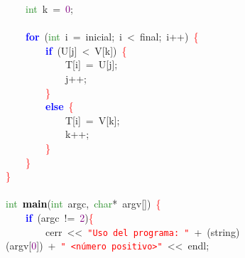 \mbox{}\ \ \ \ \textcolor{ForestGreen}{int}\ k\ \textcolor{BrickRed}{=}\ \textcolor{Purple}{0}\textcolor{BrickRed}{;} \\
\mbox{} \\
\mbox{}\ \ \ \ \textbf{\textcolor{Blue}{for}}\ \textcolor{BrickRed}{(}\textcolor{ForestGreen}{int}\ i\ \textcolor{BrickRed}{=}\ inicial\textcolor{BrickRed}{;}\ i\ \textcolor{BrickRed}{\textless{}}\ final\textcolor{BrickRed}{;}\ i\textcolor{BrickRed}{++)}\ \textcolor{Red}{\{} \\
\mbox{}\ \ \ \ \ \ \ \ \textbf{\textcolor{Blue}{if}}\ \textcolor{BrickRed}{(}U\textcolor{BrickRed}{[}j\textcolor{BrickRed}{]}\ \textcolor{BrickRed}{\textless{}}\ V\textcolor{BrickRed}{[}k\textcolor{BrickRed}{])}\ \textcolor{Red}{\{} \\
\mbox{}\ \ \ \ \ \ \ \ \ \ \ \ T\textcolor{BrickRed}{[}i\textcolor{BrickRed}{]}\ \textcolor{BrickRed}{=}\ U\textcolor{BrickRed}{[}j\textcolor{BrickRed}{];} \\
\mbox{}\ \ \ \ \ \ \ \ \ \ \ \ j\textcolor{BrickRed}{++;} \\
\mbox{}\ \ \ \ \ \ \ \ \textcolor{Red}{\}} \\
\mbox{}\ \ \ \ \ \ \ \ \textbf{\textcolor{Blue}{else}}\ \textcolor{Red}{\{} \\
\mbox{}\ \ \ \ \ \ \ \ \ \ \ \ T\textcolor{BrickRed}{[}i\textcolor{BrickRed}{]}\ \textcolor{BrickRed}{=}\ V\textcolor{BrickRed}{[}k\textcolor{BrickRed}{];} \\
\mbox{}\ \ \ \ \ \ \ \ \ \ \ \ k\textcolor{BrickRed}{++;} \\
\mbox{}\ \ \ \ \ \ \ \ \textcolor{Red}{\}} \\
\mbox{}\ \ \ \ \textcolor{Red}{\}} \\
\mbox{}\textcolor{Red}{\}} \\
\mbox{} \\
\mbox{}\textcolor{ForestGreen}{int}\ \textbf{\textcolor{Black}{main}}\textcolor{BrickRed}{(}\textcolor{ForestGreen}{int}\ argc\textcolor{BrickRed}{,}\ \textcolor{ForestGreen}{char}\textcolor{BrickRed}{*}\ argv\textcolor{BrickRed}{[])}\ \textcolor{Red}{\{} \\
\mbox{}\ \ \ \ \textbf{\textcolor{Blue}{if}}\ \textcolor{BrickRed}{(}argc\ \textcolor{BrickRed}{!=}\ \textcolor{Purple}{2}\textcolor{BrickRed}{)}\textcolor{Red}{\{} \\
\mbox{}\ \ \ \ \ \ \ \ cerr\ \textcolor{BrickRed}{\textless{}\textless{}}\ \texttt{\textcolor{Red}{"{}Uso\ del\ programa:\ "{}}}\ \textcolor{BrickRed}{+}\ \textcolor{BrickRed}{(}string\textcolor{BrickRed}{)(}argv\textcolor{BrickRed}{[}\textcolor{Purple}{0}\textcolor{BrickRed}{])}\ \textcolor{BrickRed}{+}\ \texttt{\textcolor{Red}{"{}\ \textless{}número\ positivo\textgreater{}"{}}}\ \textcolor{BrickRed}{\textless{}\textless{}}\ endl\textcolor{BrickRed}{;}\ \  \\
